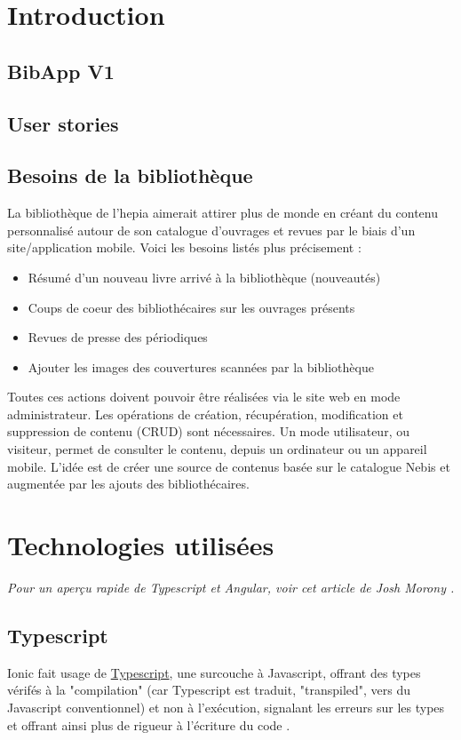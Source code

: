 \documentclass[a4paper, 12pt]{article}
\begin{document}
\newpage

\tableofcontents
\newpage
\listoffigures
\renewcommand\listoflistingscaption{Table des listings de code source}
\listoflistings
\newpage

\section{Introduction}
\subsection{BibApp V1}
\subsection{User stories}
\subsection{Besoins de la bibliothèque}
La bibliothèque de l'hepia aimerait attirer plus de monde en créant du contenu personnalisé autour de son
catalogue d'ouvrages et revues par le biais d'un site/application mobile. Voici les besoins listés plus
précisement :
\begin{itemize}
    \item Résumé d'un nouveau livre arrivé à la bibliothèque (nouveautés)
    \item Coups de coeur des bibliothécaires sur les ouvrages présents
    \item Revues de presse des périodiques
    \item Ajouter les images des couvertures scannées par la bibliothèque
\end{itemize}
Toutes ces actions doivent pouvoir être réalisées via le site web en mode administrateur. Les opérations de
création, récupération, modification et suppression de contenu (CRUD) sont nécessaires. Un mode utilisateur, ou visiteur,
permet de consulter le contenu, depuis un ordinateur ou un appareil mobile. L'idée est de créer une source
de contenus basée sur le catalogue Nebis et augmentée par les ajouts des bibliothécaires.

\section{Technologies utilisées}
\textit{Pour un aperçu rapide de Typescript et Angular, voir cet article de Josh Morony \cite{ref30}.}
\subsection{Typescript}
Ionic fait usage de \href{http://www.typescriptlang.org/}{Typescript}, une surcouche à Javascript, offrant des types
vérifés à la "compilation" (car Typescript est traduit, "transpiled", vers du Javascript conventionnel) et non à
l'exécution, signalant les erreurs sur les types et offrant ainsi plus de rigueur à l'écriture du code \cite{ref12}.
\end{document}
